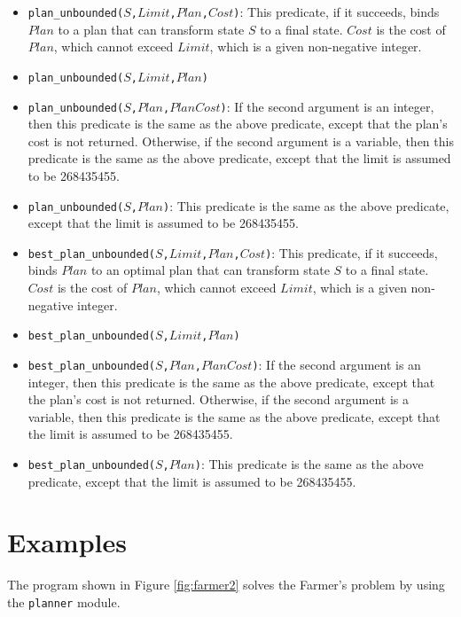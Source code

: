 \begin{itemize}
\item \texttt{plan\_unbounded($S$,$Limit$,$Plan$,$Cost$)}: This predicate, if it succeeds, binds $Plan$ to a plan that can transform state $S$ to a final state. $Cost$ is the cost of $Plan$, which cannot exceed $Limit$, which is a given non-negative integer.

\item \texttt{plan\_unbounded($S$,$Limit$,$Plan$)} 
\item \texttt{plan\_unbounded($S$,$Plan$,$PlanCost$)}: 
If the second argument is an integer, then this predicate is the same as the above predicate, except that the plan's cost is not returned. Otherwise, if the second argument is a variable, then this predicate is the same as the above predicate, except that the limit is assumed to be 268435455.

\item \texttt{plan\_unbounded($S$,$Plan$)}: This predicate is the same as the above predicate, except that the limit is assumed to be 268435455.

\item \texttt{best\_plan\_unbounded($S$,$Limit$,$Plan$,$Cost$)}: This predicate, if it succeeds, binds $Plan$ to an optimal plan that can transform state $S$ to a final state. $Cost$ is the cost of $Plan$, which cannot exceed $Limit$, which is a given non-negative integer.

\item \texttt{best\_plan\_unbounded($S$,$Limit$,$Plan$)} 
\item \texttt{best\_plan\_unbounded($S$,$Plan$,$PlanCost$)}: 
If the second argument is an integer, then this predicate is the same as the above predicate, except that the plan's cost is not returned. Otherwise, if the second argument is a variable, then this predicate is the same as the above predicate, except that the limit is assumed to be 268435455.

\item \texttt{best\_plan\_unbounded($S$,$Plan$)}: This predicate is the same as the above predicate, except that the limit is assumed to be 268435455.
\end{itemize}

\section{Examples}
The program shown in Figure \ref{fig:farmer2} solves the Farmer's problem by using the \texttt{planner} module. 


